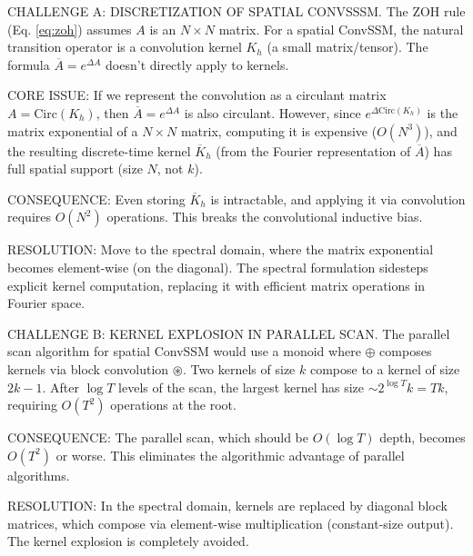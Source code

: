 \documentclass{article}
\begin{document}
\begin{thomasbox}
CHALLENGE A: DISCRETIZATION OF SPATIAL CONVSSSM. The ZOH rule (Eq. \ref{eq:zoh}) assumes $A$ is an $N \times N$ matrix. For a spatial ConvSSM, the natural transition operator is a convolution kernel $K_h$ (a small matrix/tensor). The formula $\overline{A} = e^{\Delta A}$ doesn't directly apply to kernels.

CORE ISSUE: If we represent the convolution as a circulant matrix $A = \mathrm{Circ}(K_h)$, then $\overline{A} = e^{\Delta A}$ is also circulant. However, since $e^{\Delta \mathrm{Circ}(K_h)}$ is the matrix exponential of a $N \times N$ matrix, computing it is expensive ($O(N^3)$), and the resulting discrete-time kernel $\overline{K}_h$ (from the Fourier representation of $\overline{A}$) has full spatial support (size $N$, not $k$).

CONSEQUENCE: Even storing $\overline{K}_h$ is intractable, and applying it via convolution requires $O(N^2)$ operations. This breaks the convolutional inductive bias.

RESOLUTION: Move to the spectral domain, where the matrix exponential becomes element-wise (on the diagonal). The spectral formulation sidesteps explicit kernel computation, replacing it with efficient matrix operations in Fourier space.
\end{thomasbox}

\begin{thomasbox}
CHALLENGE B: KERNEL EXPLOSION IN PARALLEL SCAN. The parallel scan algorithm for spatial ConvSSM would use a monoid where $\oplus$ composes kernels via block convolution $\circledast$. Two kernels of size $k$ compose to a kernel of size $2k-1$. After $\log T$ levels of the scan, the largest kernel has size $\sim 2^{\log T} k = Tk$, requiring $O(T^2)$ operations at the root.

CONSEQUENCE: The parallel scan, which should be $O(\log T)$ depth, becomes $O(T^2)$ or worse. This eliminates the algorithmic advantage of parallel algorithms.

RESOLUTION: In the spectral domain, kernels are replaced by diagonal block matrices, which compose via element-wise multiplication (constant-size output). The kernel explosion is completely avoided.
\end{thomasbox}
\end{document}
